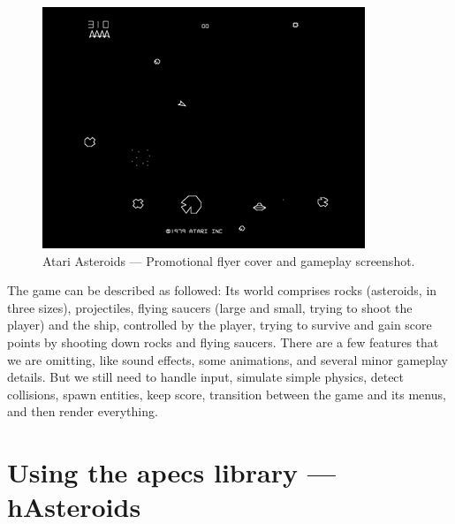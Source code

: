 \documentclass[
  digital, %
  color,   %
  table,   %
  oneside, %
  lof,     %
  lot,     %
]{fithesis3}
\begin{document}
\begin{figure}
\begin{minipage}{0.33\textwidth}
    \end{minipage}
    \hfill
    \begin{minipage}{0.66\textwidth}
        \hfill \includegraphics[height=0.65\textwidth]{images/atariasteroids-screenshot.png}
    \end{minipage}
    \caption{Atari Asteroids --- Promotional flyer cover\cite{asteroidsflyer}
    and gameplay screenshot.\cite{asteroidsscreenshot}}
\end{figure}

The game can be described as followed:
\cite{aboutasteroids}
Its world comprises rocks (asteroids, in three sizes), projectiles,
flying saucers (large and small, trying to shoot the player) and the ship, controlled by the player,
trying to survive and gain score points by shooting down rocks and flying saucers.
There are a few features that we are omitting, like sound effects, some animations,
and several minor gameplay details. But we still need to handle input, simulate simple physics,
detect collisions, spawn entities, keep score, transition between the game
and its menus, and then render everything.



\chapter{Using the apecs library --- hAsteroids}
\label{chptr:hasteroids}
\end{document}

